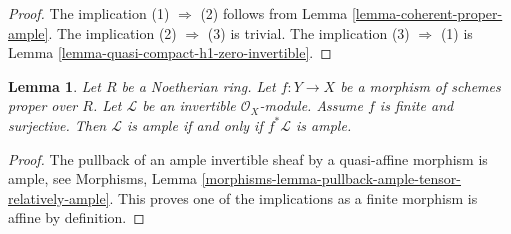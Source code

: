 \documentclass{stacks-project}
\theoremstyle{plain}
\newtheorem{lemma}[subsection]{Lemma}
\theoremstyle{definition}
\theoremstyle{remark}
\numberwithin{equation}{subsection}
\begin{document}
\begin{proof}
The implication (1) $\Rightarrow$ (2) follows from
Lemma \ref{lemma-coherent-proper-ample}.
The implication (2) $\Rightarrow$ (3) is trivial.
The implication (3) $\Rightarrow$ (1) is
Lemma \ref{lemma-quasi-compact-h1-zero-invertible}.
\end{proof}

\begin{lemma}
\label{lemma-surjective-finite-morphism-ample}
Let $R$ be a Noetherian ring. Let $f : Y \to X$ be a morphism of
schemes proper over $R$. Let $\mathcal{L}$ be an
invertible $\mathcal{O}_X$-module. Assume $f$ is finite and surjective.
Then $\mathcal{L}$ is ample if and only if $f^*\mathcal{L}$ is ample.
\end{lemma}

\begin{proof}
The pullback of an ample invertible sheaf by a quasi-affine morphism
is ample, see Morphisms, Lemma
\ref{morphisms-lemma-pullback-ample-tensor-relatively-ample}.
This proves one of the implications as a finite morphism is affine
by definition.


\end{proof}
\end{document}

